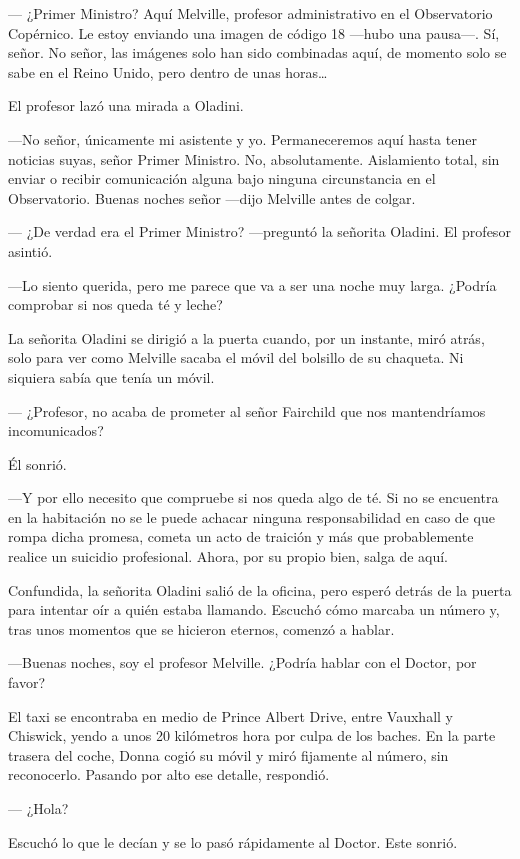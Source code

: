 --- ¿Primer Ministro? Aquí Melville, profesor administrativo en el
Observatorio Copérnico. Le estoy enviando una imagen de código 18
---hubo una pausa---. Sí, señor. No señor, las imágenes solo han sido
combinadas aquí, de momento solo se sabe en el Reino Unido, pero dentro
de unas horas\ldots{}

El profesor lazó una mirada a Oladini.

---No señor, únicamente mi asistente y yo. Permaneceremos aquí hasta
tener noticias suyas, señor Primer Ministro. No, absolutamente.
Aislamiento total, sin enviar o recibir comunicación alguna bajo ninguna
circunstancia en el Observatorio. Buenas noches señor ---dijo Melville
antes de colgar.

--- ¿De verdad era el Primer Ministro?  ---preguntó la señorita Oladini.
El profesor asintió.

---Lo siento querida, pero me parece que va a ser una noche muy larga.
¿Podría comprobar si nos queda té y leche?

La señorita Oladini se dirigió a la puerta cuando, por un instante, miró
atrás, solo para ver como Melville sacaba el móvil del bolsillo de su
chaqueta. Ni siquiera sabía que tenía un móvil.

--- ¿Profesor, no acaba de prometer al señor Fairchild que nos
mantendríamos incomunicados?

Él sonrió.

---Y por ello necesito que compruebe si nos queda algo de té. Si no se
encuentra en la habitación no se le puede achacar ninguna
responsabilidad en caso de que rompa dicha promesa, cometa un acto de
traición y más que probablemente realice un suicidio profesional. Ahora,
por su propio bien, salga de aquí.

Confundida, la señorita Oladini salió de la oficina, pero esperó detrás
de la puerta para intentar oír a quién estaba llamando. Escuchó cómo
marcaba un número y, tras unos momentos que se hicieron eternos, comenzó
a hablar.

---Buenas noches, soy el profesor Melville. ¿Podría hablar con el
Doctor, por favor?

El taxi se encontraba en medio de Prince Albert Drive, entre Vauxhall y
Chiswick, yendo a unos 20 kilómetros hora por culpa de los baches. En la
parte trasera del coche, Donna cogió su móvil y miró fijamente al
número, sin reconocerlo. Pasando por alto ese detalle, respondió.

--- ¿Hola?

Escuchó lo que le decían y se lo pasó rápidamente al Doctor. Este
sonrió.


